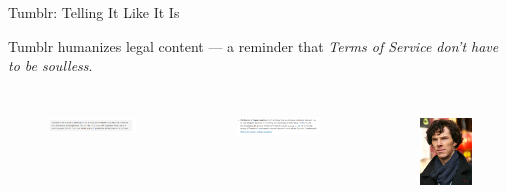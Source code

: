 \begin{frame}{Tumblr: Telling It Like It Is}

Tumblr humanizes legal content — a reminder that \textit{Terms of Service don’t have to be soulless}.
    \begin{columns}[c]
    \begin{figure}
        \centering
        \includegraphics[width=\textwidth]{images/kids.png}
        \label{fig:kids}
    \end{figure}  
    \begin{figure}
        \centering
        \includegraphics[width=\textwidth]{images/impersonate.png}
        \label{fig:impersonate}
    \end{figure}   
    \centering
    \begin{figure}
        \centering
        \includegraphics[width=\textwidth]{images/benedict.jpg}
        \label{fig:benedict}
    \end{figure}    
\end{columns}
\end{frame}

